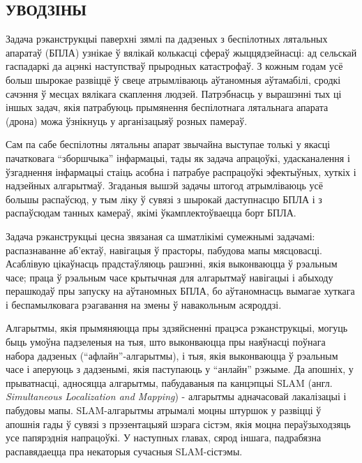 \begin{center}
    \section*{УВОДЗІНЫ}
\end{center}

\vspace{5mm}

Задача рэканструкцыі паверхні зямлі па дадзеных з беспілотных лятальных апаратаў
(БПЛА) узнікае ў вялікай колькасці сфераў жыццядзейнасці: ад сельскай гаспадаркі да
ацэнкі наступстваў прыродных катастрофаў. З кожным годам усё больш шырокае развіццё ў свеце
атрымліваюць аўтаномныя аўтамабілі, сродкі сачэння ў месцах вялікага скаплення людзей.
Патрэбнасць у вырашэнні тых ці іншых задач,
якія патрабуюць прымянення беспілотнага лятальнага апарата (дрона) можа ўзнікнуць
у арганізацыяў розных памераў.

Сам па сабе беспілотны лятальны апарат звычайна выступае толькі у якасці пачатковага
``зборшчыка'' інфармацыі, тады як задача апрацоўкі, удасканалення і ўзгаднення інфармацыі
стаіць асобна і патрабуе распрацоўкі эфектыўных, хуткіх і надзейных алгарытмаў.
Згаданыя вышэй задачы штогод атрымліваюць усё большы распаўсюд, у тым ліку ў сувязі
з шырокай даступнасцю БПЛА і з распаўсюдам танных камераў, якімі ўкамплектоўваецца борт БПЛА.

Задача рэканструкцыі цесна звязаная са шматлікімі сумежнымі задачамі:
распазнаванне аб'ектаў, навігацыя ў прасторы, пабудова мапы мясцовасці.
Асаблівую цікаўнасць прадстаўляюць рашэнні, якія выконваюцца ў рэальным часе;
праца ў рэальным часе крытычная для алгарытмаў навігацыі і абыходу перашкодаў
пры запуску на аўтаномных БПЛА, бо аўтаномнасць вымагае хуткага і беспамылковага рэагавання
на змены ў навакольным асяроддзі.

Алгарытмы, якія прымяняюцца пры здзяйсненні працэса рэканструкцыі, могуць быць умоўна падзеленыя на тыя,
што выконваюцца пры наяўнасці поўнага набора дадзеных (``афлайн''-алгарытмы), і тыя, якія выконваюцца ў рэальным
часе і аперуюць з дадзенымі, якія паступаюць у ``анлайн'' рэжыме. Да апошніх, у прыватнасці,
адносяцца алгарытмы, пабудаваныя па канцэпцыі SLAM (англ. \textit{Simultaneous
Localization and Mapping}) - алгарытмы адначасовай лакалізацыі і пабудовы мапы.
SLAM-алгарытмы атрымалі моцны штуршок у развіцці ў апошнія гады ў сувязі з прэзентацыяй
шэрага сістэм, якія моцна пераўзыходзяць усе папярэднія напрацоўкі. У наступных главах,
сярод іншага, падрабязна распавядаецца пра некаторыя сучасныя SLAM-сістэмы.


